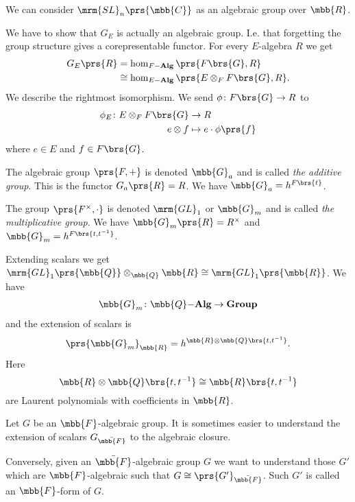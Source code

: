 \documentclass[10pt,a4paper,twoside,openany,hidelinks]{book}
\begin{document}
\begin{example}
We can consider $\mrm{SL}_n\prs{\mbb{C}}$ as an algebraic group over $\mbb{R}$.
\end{example}

We have to show that $G_E$ is actually an algebraic group. I.e. that forgetting the group structure gives a corepresentable functor.
For every $E$-algebra $R$ we get
\begin{align*}
G_E\prs{R} &= \hom_{F\mbf{-Alg}}\prs{F\brs{G}, R}
\\&\cong \hom_{E\mbf{-Alg}}\prs{E \otimes_F F\brs{G}, R} \text{.} 
\end{align*}
We describe the rightmost isomorphism.
We send $\phi \colon F\brs{G} \to R$ to
\begin{align*}
\phi_E \colon E \otimes_F F\brs{G} &\to R \\
e \otimes f &\mapsto e \cdot \phi\prs{f}
\end{align*}
where $e \in E$ and $f \in F\brs{G}$.

\begin{example}
The algebraic group $\prs{F,+}$ is denoted $\mbb{G}_a$ and is called \emph{the additive group}. This is the functor $G_a\prs{R} = R$. We have $\mbb{G}_a = h^{F\brs{t}}$.
\end{example}

\begin{example}
The group $\prs{F^\times, \cdot}$ is denoted $\mrm{GL}_1$ or $\mbb{G}_m$ and is called \emph{the multiplicative group}. We have $\mbb{G}_m\prs{R} = R^\times$ and $\mbb{G}_m = h^{F\brs{t,t^{-1}}}$.

Extending scalars we get $\mrm{GL}_1\prs{\mbb{Q}} \otimes_{\mbb{Q}} \mbb{R} \cong \mrm{GL}_1\prs{\mbb{R}}$. We have
\begin{align*}
\mbb{G}_m \colon \mbb{Q}\mbf{-Alg} \to \mbf{Group}
\end{align*}
and the extension of scalars is
\[\prs{\mbb{G}_m}_{\mbb{R}} = h^{\mbb{R} \otimes \mbb{Q}\brs{t,t^{-1}}} \text{.}\]
Here
\[\mbb{R} \otimes \mbb{Q}\brs{t,t^{-1}} \cong \mbb{R}\brs{t,t^{-1}}\]
are Laurent polynomials with coefficients in $\mbb{R}$.
\end{example}

\begin{example}
Let $G$ be an $\mbb{F}$-algebraic group.
It is sometimes easier to understand the extension of scalars $G_{\bar{\mbb{F}}}$ to the algebraic closure.

Conversely, given an $\bar{\mbb{F}}$-algebraic group $G$ we want to understand those $G'$ which are $\mbb{F}$-algebraic such that $G \cong \prs{G'}_{\bar{\mbb{F}}}$. Such $G'$ is called an $\mbb{F}$-form of $G$.
\end{example}
\end{document}
